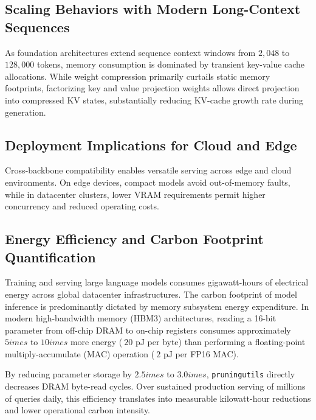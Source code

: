 \subsection{Scaling Behaviors with Modern Long-Context Sequences}
As foundation architectures extend sequence context windows from $2{,}048$ to $128{,}000$ tokens, memory consumption is dominated by transient key-value cache allocations. While weight compression primarily curtails static memory footprints, factorizing key and value projection weights allows direct projection into compressed KV states, substantially reducing KV-cache growth rate during generation.

\subsection{Deployment Implications for Cloud and Edge}
Cross-backbone compatibility enables versatile serving across edge and cloud environments. On edge devices, compact models avoid out-of-memory faults, while in datacenter clusters, lower VRAM requirements permit higher concurrency and reduced operating costs.

\subsection{Energy Efficiency and Carbon Footprint Quantification}
Training and serving large language models consumes gigawatt-hours of electrical energy across global datacenter infrastructures. The carbon footprint of model inference is predominantly dictated by memory subsystem energy expenditure. In modern high-bandwidth memory (HBM3) architectures, reading a 16-bit parameter from off-chip DRAM to on-chip registers consumes approximately $5	imes$ to $10	imes$ more energy ($~20$ pJ per byte) than performing a floating-point multiply-accumulate (MAC) operation ($~2$ pJ per FP16 MAC).

By reducing parameter storage by $2.5	imes$ to $3.0	imes$, \texttt{pruningutils} directly decreases DRAM byte-read cycles. Over sustained production serving of millions of queries daily, this efficiency translates into measurable kilowatt-hour reductions and lower operational carbon intensity.
